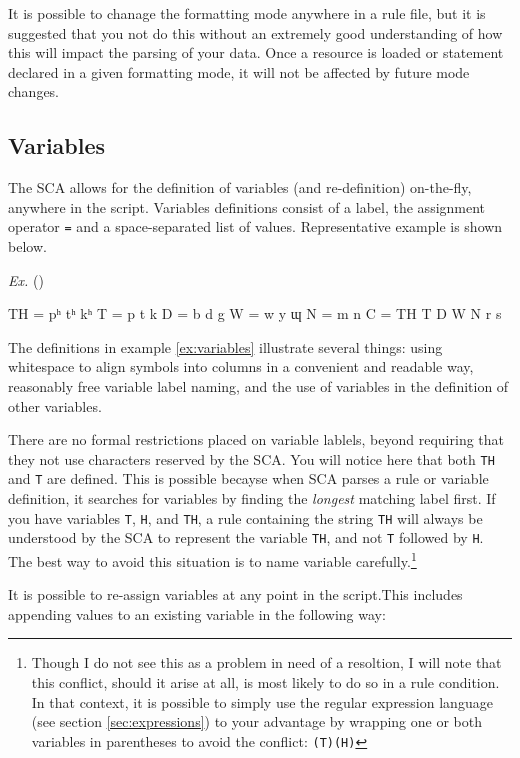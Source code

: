 \documentclass[10pt,letterpaper]{article}
\newcounter{vexcounter}
\newenvironment{vex}[1]{
	\refstepcounter{vexcounter}
	\noindent\emph{Ex.} (\arabic{vexcounter}\label{#1})
	\verbatim
}{\endverbatim}
\begin{document}
It is possible to chanage the formatting mode anywhere in a rule file, but it is suggested that you not do this without an extremely good understanding of how this will impact the parsing of your data. Once a resource is loaded or statement declared in a given formatting mode, it will not be affected by future mode changes.

\subsection{Variables}\label{sec:variables}
The SCA allows for the definition of variables (and re-definition) on-the-fly, anywhere in the script. Variables definitions consist of a label, the assignment operator \texttt{=} and a space-separated list of values. Representative example is shown below.

\begin{vex}{ex:variables}
TH = pʰ tʰ kʰ
T  = p  t  k
D  = b  d  g
W  = w  y  ɰ
N  = m  n
C  = TH T D W N r s
\end{vex}

The definitions in example \ref{ex:variables} illustrate several things: using whitespace to align symbols into columns in a convenient and readable way, reasonably free variable label naming, and the use of variables in the definition of other variables.

There are no formal restrictions placed on variable lablels, beyond requiring that they not use characters reserved by the SCA. You will notice here that both \texttt{TH} and \texttt{T} are defined. This is possible becayse when SCA parses a rule or variable definition, it searches for variables by finding the \emph{longest} matching label first. If you have variables \texttt{T}, \texttt{H}, and \texttt{TH}, a rule containing the string \texttt{TH} will always be understood by the SCA to represent the variable \texttt{TH}, and not \texttt{T} followed by \texttt{H}. The best way to avoid this situation is to name variable carefully.\footnote{Though I do not see this as a problem in need of a resoltion, I will note that this conflict, should it arise at all, is most likely to do so in a rule condition. In that context, it is possible to simply use the regular expression language (see section \ref{sec:expressions}) to your advantage by wrapping one or both variables in parentheses to avoid the conflict: \texttt{(T)(H)}}

It is possible to re-assign variables at any point in the script.This includes appending values to an existing variable in the following way:
\end{document}
